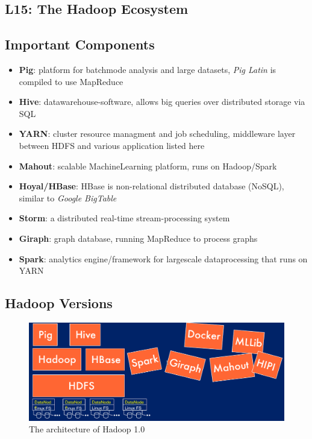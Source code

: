 \documentclass[a4paper]{article}
\begin{document}
\begin{multicols}{3}
\section{L15: The Hadoop Ecosystem}

\subsection{Important Components}
\begin{itemize}
    \item \textbf{Pig}: platform for batchmode analysis and large datasets, \textit{Pig Latin} is compiled to use MapReduce
    \item \textbf{Hive}: datawarehouse-software, allows big queries over distributed storage via SQL
    \item \textbf{YARN}: cluster resource managment and job scheduling, middleware layer between HDFS and various application listed here
    \item \textbf{Mahout}: scalable MachineLearning platform, runs on Hadoop/Spark
    \item \textbf{Hoyal/HBase}: HBase is non-relational distributed database (NoSQL), similar to \textit{Google BigTable}
    \item \textbf{Storm}: a distributed real-time stream-processing system
    \item \textbf{Giraph}: graph database, running MapReduce to process graphs
    \item \textbf{Spark}: analytics engine/framework for largescale dataprocessing that runs on YARN
\end{itemize}

\subsection{Hadoop Versions}
\begin{figure}[H]
    \includegraphics[width=\linewidth]{HadoopV1.png}
    \caption{The architecture of Hadoop 1.0}
    \label{fig:hadoopv1}
\end{figure}


\end{multicols}
\end{document}
